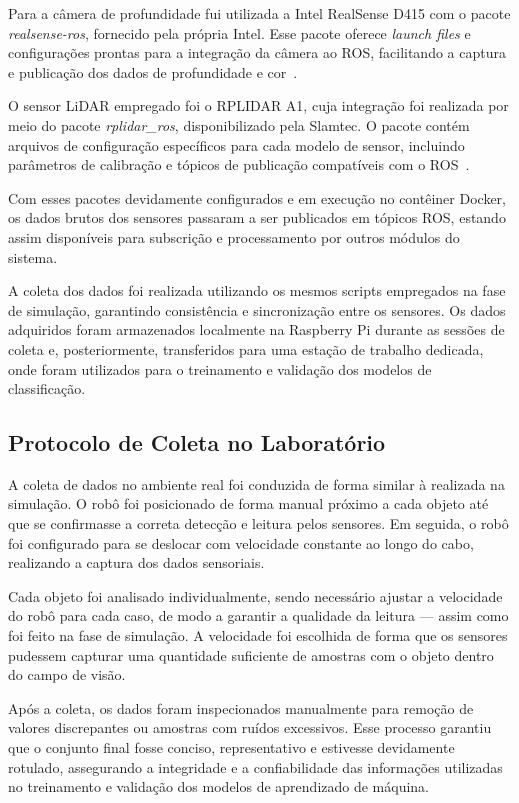 Para a câmera de profundidade fui utilizada a Intel RealSense D415 com o pacote \textit{realsense-ros}, fornecido pela própria Intel. Esse pacote oferece \textit{launch files} e configurações prontas para a integração da câmera ao ROS, facilitando a captura e publicação dos dados de profundidade e cor~\cite{realsense_ros}.

O sensor LiDAR empregado foi o RPLIDAR A1, cuja integração foi realizada por meio do pacote \textit{rplidar\_ros}, disponibilizado pela Slamtec. O pacote contém arquivos de configuração específicos para cada modelo de sensor, incluindo parâmetros de calibração e tópicos de publicação compatíveis com o ROS~\cite{rplidar_ros}.

Com esses pacotes devidamente configurados e em execução no contêiner Docker, os dados brutos dos sensores passaram a ser publicados em tópicos ROS, estando assim disponíveis para subscrição e processamento por outros módulos do sistema.

A coleta dos dados foi realizada utilizando os mesmos scripts empregados na fase de simulação, garantindo consistência e sincronização entre os sensores. Os dados adquiridos foram armazenados localmente na Raspberry Pi durante as sessões de coleta e, posteriormente, transferidos para uma estação de trabalho dedicada, onde foram utilizados para o treinamento e validação dos modelos de classificação.

\subsection{Protocolo de Coleta no Laboratório}

A coleta de dados no ambiente real foi conduzida de forma similar à realizada na simulação. O robô foi posicionado de forma manual próximo a cada objeto até que se confirmasse a correta detecção e leitura pelos sensores. Em seguida, o robô foi configurado para se deslocar com velocidade constante ao longo do cabo, realizando a captura dos dados sensoriais.

Cada objeto foi analisado individualmente, sendo necessário ajustar a velocidade do robô para cada caso, de modo a garantir a qualidade da leitura — assim como foi feito na fase de simulação. A velocidade foi escolhida de forma que os sensores pudessem capturar uma quantidade suficiente de amostras com o objeto dentro do campo de visão.

Após a coleta, os dados foram inspecionados manualmente para remoção de valores discrepantes ou amostras com ruídos excessivos. Esse processo garantiu que o conjunto final fosse conciso, representativo e estivesse devidamente rotulado, assegurando a integridade e a confiabilidade das informações utilizadas no treinamento e validação dos modelos de aprendizado de máquina.

